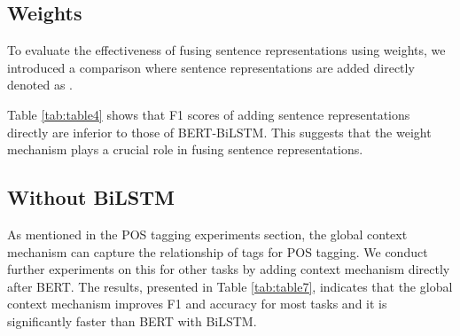 \documentclass[lettersize,journal]{IEEEtran}
\begin{document}
\subsection{Weights}
To evaluate the effectiveness of fusing sentence representations using weights, we introduced a comparison where sentence representations are added directly denoted as .


Table \ref{tab:table4} shows that F1 scores of adding sentence representations directly are inferior to those of BERT-BiLSTM. This suggests that the weight mechanism plays a crucial role in fusing sentence representations.

\subsection{Without BiLSTM}
As mentioned in the POS tagging experiments section, the global context mechanism can capture the relationship of tags for POS tagging. We conduct further experiments on this for other tasks by adding context mechanism directly after BERT. The results, presented in Table \ref{tab:table7}, indicates that the global context mechanism improves F1 and accuracy for most tasks and it is significantly faster than BERT with BiLSTM. 
\end{document}
